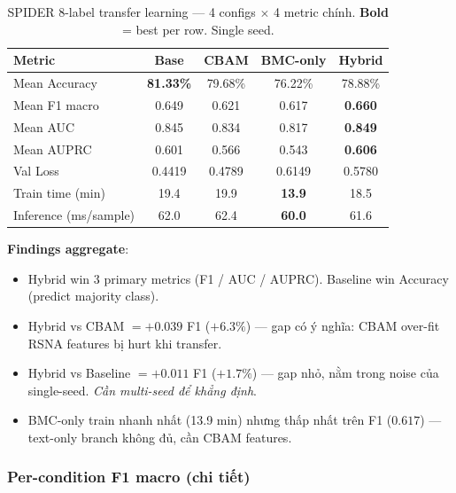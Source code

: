 \documentclass[11pt,a4paper]{article}
\newcommand{\best}[1]{\textcolor{best}{\textbf{#1}}}
\begin{document}
\begin{table}[h]
\centering
\caption{SPIDER 8-label transfer learning --- 4 configs $\times$ 4
metric chính. \best{Bold} = best per row. Single seed.}
\label{tab:spider_aggregate}
\begin{tabular}{@{}lcccc@{}}
\toprule
\rowcolor{tablehdr}
Metric & Base & CBAM & BMC-only & \best{Hybrid} \\
\midrule
Mean Accuracy & \best{81.33\%} & 79.68\% & 76.22\% & 78.88\% \\
Mean F1 macro & 0.649          & 0.621   & 0.617   & \best{0.660} \\
Mean AUC      & 0.845          & 0.834   & 0.817   & \best{0.849} \\
Mean AUPRC    & 0.601          & 0.566   & 0.543   & \best{0.606} \\
\midrule
Val Loss              & 0.4419     & 0.4789 & 0.6149 & 0.5780 \\
Train time (min)      & 19.4       & 19.9   & \best{13.9} & 18.5 \\
Inference (ms/sample) & 62.0       & 62.4   & \best{60.0} & 61.6 \\
\bottomrule
\end{tabular}
\end{table}

\noindent\textbf{Findings aggregate}:
\begin{itemize}[leftmargin=*]
\item Hybrid win 3 primary metrics (F1 / AUC / AUPRC). Baseline win
Accuracy (predict majority class).
\item Hybrid vs CBAM $= +0.039$ F1 ($+6.3\%$) --- gap có ý nghĩa: CBAM
over-fit RSNA features bị hurt khi transfer.
\item Hybrid vs Baseline $= +0.011$ F1 ($+1.7\%$) --- gap nhỏ, nằm
trong noise của single-seed. \emph{Cần multi-seed để khẳng định}.
\item BMC-only train nhanh nhất (13.9 min) nhưng thấp nhất trên F1
($0.617$) --- text-only branch không đủ, cần CBAM features.
\end{itemize}

\subsubsection*{Per-condition F1 macro (chi tiết)}
\end{document}
